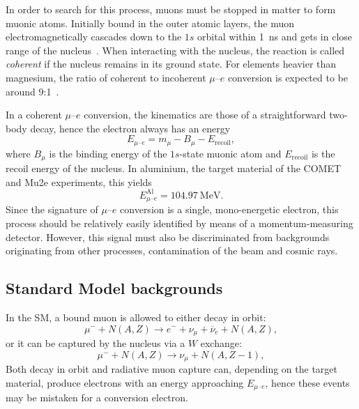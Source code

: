 In order to search for this process, muons must be stopped in matter to form
muonic atoms. Initially bound in the outer atomic layers, the muon
electromagnetically cascades down to the $1s$ orbital within \SI{1}{\ns}
and gets in close range of the nucleus~\cite{Knecht2020}. 
When interacting with the nucleus, the reaction is called \emph{coherent} if the
nucleus remains in its ground state. For elements heavier than magnesium, the
ratio of coherent to incoherent $\mu$--$e$ conversion is expected to be around
9:1~\cite{CHIANG1993526}.

In a coherent $\mu$--$e$ conversion, the kinematics are those of a
straightforward two-body decay, hence the electron always has an energy
\begin{equation*}\label{eq:mu_e_conv_energy}
E_{\mu\text{--}e} = m_\mu - B_\mu - E_\mathrm{recoil},
\end{equation*}
where $B_\mu$ is the binding energy of the $1s$-state muonic atom and
$E_\mathrm{recoil}$ is the recoil energy of the nucleus. In aluminium, the
target material of the COMET and Mu2e experiments, this yields
$$
    E^\mathrm{Al}_{\mu\text{--}e} = \SI{104.97}{\MeV}.
$$
Since the signature of $\mu$--$e$ conversion is a single, mono-energetic
electron, this process should be relatively easily identified by means of a
momentum-measuring detector. However, this signal must also be discriminated
from backgrounds originating from other processes, contamination of the beam and
cosmic rays.

\subsection{Standard Model backgrounds}
In the SM, a bound muon is allowed to either decay in orbit: 
\begin{equation*}\label{eq:dio}
    \mu^- + N(A, Z) \rightarrow e^- + \nu_\mu + \overline{\nu}_e + N(A, Z),
\end{equation*}
or it can be captured by the nucleus via a $W$ exchange:
\begin{equation*}\label{eq:capture}
    \mu^- + N(A, Z) \rightarrow \nu_\mu + N(A, Z-1),
\end{equation*}
Both decay in orbit and radiative muon capture can, depending on the target
material, produce electrons with an energy approaching $E_{\mu\text{--}e}$,
hence these events may be mistaken for a conversion electron. 

